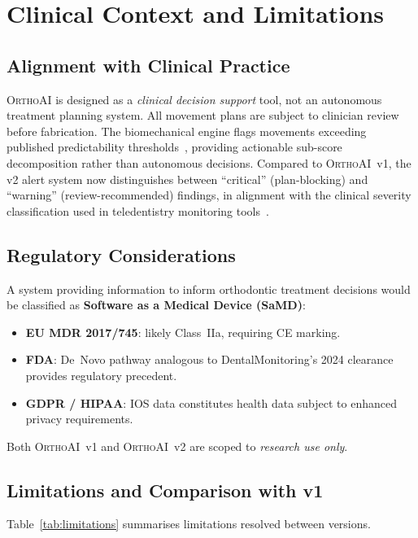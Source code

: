 \documentclass[10pt,twocolumn]{article}
\newcommand{\orthoai}{\textsc{OrthoAI}}
\newcommand{\vone}{\orthoai{}~v1}
\newcommand{\vtwo}{\orthoai{}~v2}
\begin{document}
\section{Clinical Context and Limitations}
\label{sec:clinical}

\subsection{Alignment with Clinical Practice}

\orthoai{} is designed as a \emph{clinical decision support} tool,
not an autonomous treatment planning system.
All movement plans are subject to clinician review before fabrication.
The biomechanical engine flags movements exceeding published predictability
thresholds~\cite{glaser2017invisalign,kravitz2009predictability},
providing actionable sub-score decomposition rather than autonomous decisions.
Compared to \vone{}, the v2 alert system now distinguishes between
``critical'' (plan-blocking) and ``warning'' (review-recommended) findings,
in alignment with the clinical severity classification used in
teledentistry monitoring tools~\cite{carlsson2024ai}.

\subsection{Regulatory Considerations}

A system providing information to inform orthodontic treatment decisions
would be classified as \textbf{Software as a Medical Device (SaMD)}:
\begin{itemize}[nosep,leftmargin=1.5em]
  \item \textbf{EU MDR 2017/745}: likely Class~IIa, requiring CE marking.
  \item \textbf{FDA}: De~Novo pathway analogous to DentalMonitoring's 2024
    clearance provides regulatory precedent.
  \item \textbf{GDPR / HIPAA}: IOS data constitutes health data subject to
    enhanced privacy requirements.
\end{itemize}
Both \vone{} and \vtwo{} are scoped to \emph{research use only}.

\subsection{Limitations and Comparison with v1}

Table~\ref{tab:limitations} summarises limitations resolved between versions.
\end{document}
